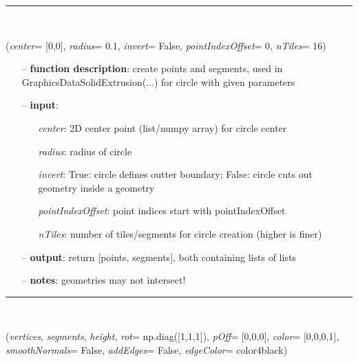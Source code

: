 \begin{itemize}[leftmargin=1.4cm]
\begin{itemize}[leftmargin=1.4cm]
\begin{itemize}[leftmargin=0.5cm]
\begin{itemize}[leftmargin=1.4cm]
\begin{itemize}[leftmargin=1.4cm]
\begin{itemize}[leftmargin=0.5cm]
\begin{itemize}[leftmargin=1.4cm]
\begin{itemize}[leftmargin=0.5cm]
%
\noindent\rule{8cm}{0.75pt}\vspace{1pt} \\ 
\begin{flushleft}
\label{sec:graphicsDataUtilities:CirclePointsAndSegments}
({\it center}= [0,0], {\it radius}= 0.1, {\it invert}= False, {\it pointIndexOffset}= 0, {\it nTiles}= 16)
\end{flushleft}
\setlength{\itemindent}{0.7cm}
\begin{itemize}[leftmargin=0.7cm]
  \item[--]  {\bf function description}: create points and segments, used in GraphicsDataSolidExtrusion(...) for circle with given parameters  \item[--]  {\bf input}: \vspace{-6pt}
  \begin{itemize}[leftmargin=1.2cm]
\setlength{\itemindent}{-0.7cm}
    \item[] {\it center}: 2D center point (list/numpy array) for circle center
    \item[] {\it   radius}: radius of circle
    \item[] {\it   invert}: True: circle defines outter boundary; False: circle cuts out geometry inside a geometry
    \item[] {\it   pointIndexOffset}: point indices start with pointIndexOffset
    \item[] {\it   nTiles}: number of tiles/segments for circle creation (higher is finer)
  \end{itemize}
  \item[--]  {\bf output}: return [points, segments], both containing lists of lists  \item[--]  {\bf notes}: geometries may not intersect!\vspace{12pt}\end{itemize}
%
\noindent\rule{8cm}{0.75pt}\vspace{1pt} \\ 
\begin{flushleft}
\label{sec:graphicsDataUtilities:GraphicsDataSolidExtrusion}
({\it vertices}, {\it segments}, {\it height}, {\it rot}= np.diag([1,1,1]), {\it pOff}= [0,0,0], {\it color}= [0,0,0,1], {\it smoothNormals}= False, {\it addEdges}= False, {\it edgeColor}= color4black)

\end{flushleft}
\end{itemize}
\end{itemize}
\end{itemize}
\end{itemize}
\end{itemize}
\end{itemize}
\end{itemize}
\end{itemize}
